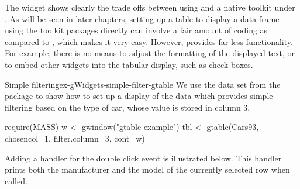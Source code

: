 The  widget shows clearly the trade offs between
using  and a native toolkit under \R. As will be seen in
later chapters, setting up a table to display a data frame using the
toolkit packages directly can involve a fair amount of coding as
compared to , which makes it very easy. However,
 provides far less functionality. For example, there is
no means to adjust the formatting of the displayed text, or to embed
other widgets into the tabular display, such as check boxes.

\begin{example}{Simple filtering}{ex-gWidgets-simple-filter-gtable}
  We use the  data set from the  package to
  show how to set up a display of the data which provides simple
  filtering based on the type of car, whose value is stored in column 3.
  
\begin{Schunk}
\begin{Sinput}
 require(MASS)
 w <- gwindow("gtable example")
 tbl <- gtable(Cars93, chosencol=1, filter.column=3, cont=w)
\end{Sinput}
\end{Schunk}

Adding a handler for the double click event is illustrated below. This
handler prints both the manufacturer and the model of the currently
selected row when called.
\begin{Schunk}
\end{Schunk}
\end{example}


